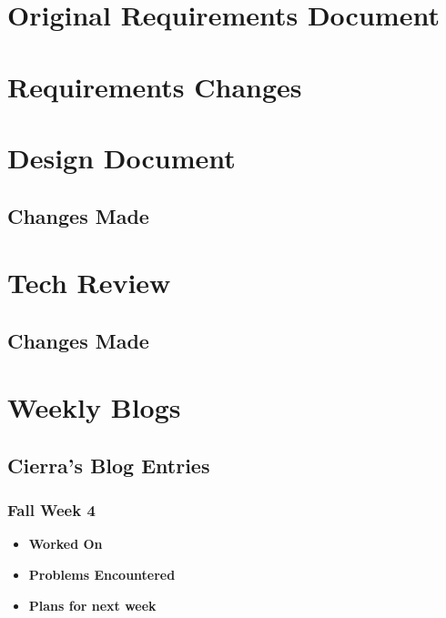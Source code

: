 \documentclass[compsoc,draftclsnofoot,onecolumn,10pt]{IEEEtran}
\begin{document}
\section{Original Requirements Document}

% 

\section{Requirements Changes}

\section{Design Document}

    \subsection{Changes Made}

\section{Tech Review}

    \subsection{Changes Made}

\section{Weekly Blogs}

\subsection{Cierra's Blog Entries}

\subsubsection{Fall Week 4}
\begin{itemize}
    \item {\textbf{Worked On}}
    \begin{itemize}
        
    \end{itemize}

    \item {\textbf{Problems Encountered}}
    \begin{itemize}
        
    \end{itemize}

    \item{\textbf{Plans for next week}}
    \begin{itemize}
        
    \end{itemize}

\end{itemize}
\end{document}
